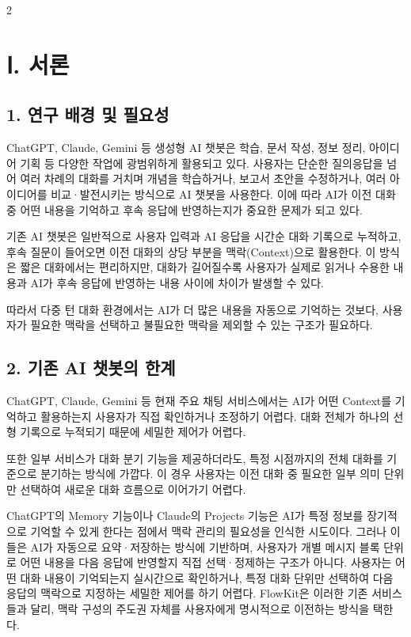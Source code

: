 \documentclass[10pt, a4paper]{article}
\begin{document}
\begin{multicols}{2}

\section*{Ⅰ. 서론}

\subsection*{1. 연구 배경 및 필요성}

ChatGPT, Claude, Gemini 등 생성형 AI 챗봇은 학습, 문서 작성, 정보 정리, 아이디어 기획 등 다양한 작업에 광범위하게 활용되고 있다. 사용자는 단순한 질의응답을 넘어 여러 차례의 대화를 거치며 개념을 학습하거나, 보고서 초안을 수정하거나, 여러 아이디어를 비교·발전시키는 방식으로 AI 챗봇을 사용한다. 이에 따라 AI가 이전 대화 중 어떤 내용을 기억하고 후속 응답에 반영하는지가 중요한 문제가 되고 있다.

기존 AI 챗봇은 일반적으로 사용자 입력과 AI 응답을 시간순 대화 기록으로 누적하고, 후속 질문이 들어오면 이전 대화의 상당 부분을 맥락(Context)으로 활용한다. 이 방식은 짧은 대화에서는 편리하지만, 대화가 길어질수록 사용자가 실제로 읽거나 수용한 내용과 AI가 후속 응답에 반영하는 내용 사이에 차이가 발생할 수 있다.

따라서 다중 턴 대화 환경에서는 AI가 더 많은 내용을 자동으로 기억하는 것보다, 사용자가 필요한 맥락을 선택하고 불필요한 맥락을 제외할 수 있는 구조가 필요하다.

\subsection*{2. 기존 AI 챗봇의 한계}

ChatGPT, Claude, Gemini 등 현재 주요 채팅 서비스에서는 AI가 어떤 Context를 기억하고 활용하는지 사용자가 직접 확인하거나 조정하기 어렵다. 대화 전체가 하나의 선형 기록으로 누적되기 때문에 세밀한 제어가 어렵다.

또한 일부 서비스가 대화 분기 기능을 제공하더라도, 특정 시점까지의 전체 대화를 기준으로 분기하는 방식에 가깝다. 이 경우 사용자는 이전 대화 중 필요한 일부 의미 단위만 선택하여 새로운 대화 흐름으로 이어가기 어렵다.

ChatGPT의 Memory 기능이나 Claude의 Projects 기능은 AI가 특정 정보를 장기적으로 기억할 수 있게 한다는 점에서 맥락 관리의 필요성을 인식한 시도이다. 그러나 이들은 AI가 자동으로 요약·저장하는 방식에 기반하며, 사용자가 개별 메시지 블록 단위로 어떤 내용을 다음 응답에 반영할지 직접 선택·정제하는 구조가 아니다. 사용자는 어떤 대화 내용이 기억되는지 실시간으로 확인하거나, 특정 대화 단위만 선택하여 다음 응답의 맥락으로 지정하는 세밀한 제어를 하기 어렵다. FlowKit은 이러한 기존 서비스들과 달리, 맥락 구성의 주도권 자체를 사용자에게 명시적으로 이전하는 방식을 택한다.


\end{multicols}
\end{document}
